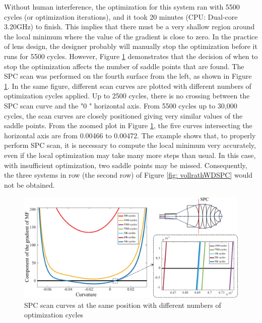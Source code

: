 Without human interference, the optimization for this system ran with 5500 cycles (or optimization iterations), and it took 20 minutes (CPU: Dual-core 3.20GHz) to finish. This implies that there must be a very shallow region around the local minimum where the value of the gradient is close to zero. In the practice of lens design, the designer probably will manually stop the optimization before it runs for 5500 cycles. However, Figure \ref{fig: vollrath_optcyc} demonstrates that the decision of when to stop the optimization affects the number of saddle points that are found. The SPC scan was performed on the fourth surface from the left, as shown in Figure \ref{fig: vollrath_optcyc}. In the same figure, different scan curves are plotted with different numbers of optimization cycles applied. Up to 2500 cycles, there is no crossing between the SPC scan curve and the "$0$ " horizontal axis. From 5500 cycles up to 30,000 cycles, the scan curves are closely positioned giving very similar values of the saddle points. From the zoomed plot in Figure \ref{fig: vollrath_optcyc}, the five curves intersecting the horizontal axis are from 0.00466 to 0.00472. The example shows that, to properly perform SPC scan, it is necessary to compute the local minimum very accurately, even if the local optimization may take many more steps than usual. In this case, with insufficient optimization, two saddle points may be missed. Consequently, the three systems in row  (the second row) of Figure \ref{fig: vollrathWDSPC} would not be obtained. 
\begin{figure}[h!]
    \centering
    \setlength{\belowcaptionskip}{-10pt}
    \includegraphics[width=\textwidth]{chapter-4/figures/vollrath_optcyc.png}
    \caption{SPC scan curves at the same position with different numbers of optimization cycles}
    \label{fig: vollrath_optcyc}
\end{figure}

\newpage
